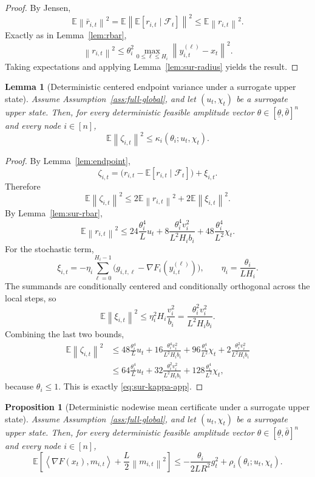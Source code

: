 \documentclass{article}
\newtheorem{lemma}[theorem]{Lemma}
\newtheorem{proposition}[theorem]{Proposition}
\theoremstyle{definition}
\newcommand{\EE}{\mathbb E}
\newcommand{\cF}{\mathcal F}
\newcommand{\norm}[1]{\left\lVert #1\right\rVert}
\newcommand{\ip}[2]{\left\langle #1,#2\right\rangle}
\begin{document}
\begin{proof}
By Jensen,
\[
\EE\norm{\bar r_{i,t}}^2
=
\EE\norm{\EE[r_{i,t}\mid \cF_t]}^2
\le
\EE\norm{r_{i,t}}^2.
\]
Exactly as in Lemma~\ref{lem:rbar},
\[
\norm{r_{i,t}}^2
\le
\theta_i^2\max_{0\le \ell\le H_i}\norm{y_{i,t}^{(\ell)}-x_t}^2.
\]
Taking expectations and applying Lemma~\ref{lem:sur-radius} yields the result.
\end{proof}

\begin{lemma}[Deterministic centered endpoint variance under a surrogate upper state]
\label{lem:sur-kappa}
Assume Assumption~\ref{ass:full-global}, and let $(u_t,\chi_t)$ be a surrogate
upper state. Then, for every deterministic feasible amplitude vector
$\theta\in[\underline\theta,\bar\theta]^n$ and every node $i\in[n]$,
\begin{equation}
\EE\norm{\zeta_{i,t}}^2
\le
\kappa_i(\theta_i;u_t,\chi_t).
\label{eq:sur-kappa-app}\end{equation}
\end{lemma}

\begin{proof}
By Lemma~\ref{lem:endpoint},
\[
\zeta_{i,t}
=
\bigl(r_{i,t}-\EE[r_{i,t}\mid \cF_t]\bigr)+\xi_{i,t}.
\]
Therefore
\[
\EE\norm{\zeta_{i,t}}^2
\le
2\EE\norm{r_{i,t}}^2+2\EE\norm{\xi_{i,t}}^2.
\]
By Lemma~\ref{lem:sur-rbar},
\[
\EE\norm{r_{i,t}}^2
\le
24\frac{\theta_i^4}{L}u_t
+
8\frac{\theta_i^4v_i^2}{L^2H_i b_i}
+
48\frac{\theta_i^4}{L^2}\chi_t.
\]
For the stochastic term,
\[
\xi_{i,t}
=
-\eta_i\sum_{\ell=0}^{H_i-1}
\bigl(g_{i,t,\ell}-\nabla F_i(y_{i,t}^{(\ell)})\bigr),
\qquad
\eta_i=\frac{\theta_i}{L H_i}.
\]
The summands are conditionally centered and conditionally orthogonal across the
local steps, so
\[
\EE\norm{\xi_{i,t}}^2
\le
\eta_i^2 H_i\frac{v_i^2}{b_i}
=
\frac{\theta_i^2v_i^2}{L^2H_i b_i}.
\]
Combining the last two bounds,
\begin{align*}
\EE\norm{\zeta_{i,t}}^2
&\le
48\frac{\theta_i^4}{L}u_t
+
16\frac{\theta_i^4v_i^2}{L^2H_i b_i}
+
96\frac{\theta_i^4}{L^2}\chi_t
+
2\frac{\theta_i^2v_i^2}{L^2H_i b_i}\\
&\le
64\frac{\theta_i^4}{L}u_t
+
32\frac{\theta_i^2v_i^2}{L^2H_i b_i}
+
128\frac{\theta_i^4}{L^2}\chi_t,
\end{align*}
because $\theta_i\le 1$. This is exactly \eqref{eq:sur-kappa-app}.
\end{proof}

\begin{proposition}[Deterministic nodewise mean certificate under a surrogate upper state]
\label{prop:sur-mean}
Assume Assumption~\ref{ass:full-global}, and let $(u_t,\chi_t)$ be a surrogate
upper state. Then, for every deterministic feasible amplitude vector
$\theta\in[\underline\theta,\bar\theta]^n$ and every node $i\in[n]$,
\begin{equation}
\EE\!\left[
\ip{\nabla F(x_t)}{m_{i,t}}
+
\frac{L}{2}\norm{m_{i,t}}^2
\right]
\le
-
\frac{\theta_i}{2LR^2}g_t^2
+
\rho_i(\theta_i;u_t,\chi_t).
\label{eq:sur-mean-app}\end{equation}
\end{proposition}
\end{document}

